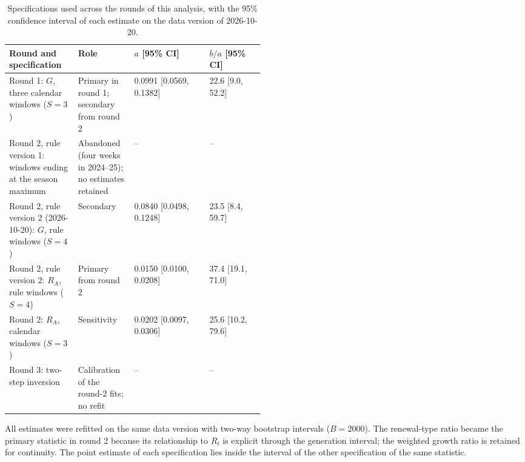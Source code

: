 \begin{table}[htbp]
\centering
\footnotesize
\setlength{\tabcolsep}{4pt}
\caption{Specifications used across the rounds of this analysis, with the 95\% confidence interval of each estimate on the data version of 2026-10-20.}
\label{tab:s9}
\begin{tabular}{p{0.27\linewidth}p{0.22\linewidth}ll}
\toprule
Round and specification & Role & $a$ [95\% CI] & $b/a$ [95\% CI] \\
\midrule
Round 1: $G$, three calendar windows ($S=3$) & Primary in round 1; secondary from round 2 & 0.0991 [0.0569, 0.1382] & 22.6 [9.0, 52.2] \\
Round 2, rule version 1: windows ending at the season maximum & Abandoned (four weeks in 2024--25); no estimates retained & -- & -- \\
Round 2, rule version 2 (2026-10-20): $G$, rule windows ($S=4$) & Secondary & 0.0840 [0.0498, 0.1248] & 23.5 [8.4, 59.7] \\
Round 2, rule version 2: $R_A$, rule windows ($S=4$) & Primary from round 2 & 0.0150 [0.0100, 0.0208] & 37.4 [19.1, 71.0] \\
Round 2: $R_A$, calendar windows ($S=3$) & Sensitivity & 0.0202 [0.0097, 0.0306] & 25.6 [10.2, 79.6] \\
Round 3: two-step inversion & Calibration of the round-2 fits; no refit & -- & -- \\
\bottomrule
\end{tabular}
\par\smallskip
\begin{minipage}{0.95\linewidth}\scriptsize All estimates were refitted on the same data version with two-way bootstrap intervals ($B=2000$). The renewal-type ratio became the primary statistic in round 2 because its relationship to $R_t$ is explicit through the generation interval; the weighted growth ratio is retained for continuity. The point estimate of each specification lies inside the interval of the other specification of the same statistic.\end{minipage}
\end{table}
